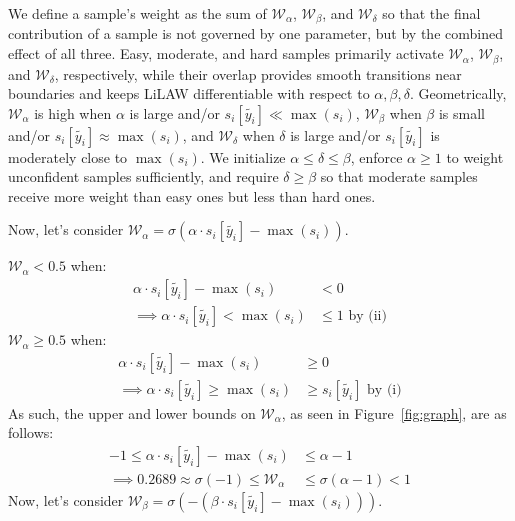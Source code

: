 \documentclass{article}
\theoremstyle{plain}
\theoremstyle{definition}
\theoremstyle{remark}
\begin{document}
We define a sample's weight as the sum of $\mathcal{W}_\alpha$, $\mathcal{W}_\beta$, and $\mathcal{W}_\delta$ so that the final contribution of a sample is not governed by one parameter, but by the combined effect of all three. Easy, moderate, and hard samples primarily activate $\mathcal{W}_\alpha$, $\mathcal{W}_\beta$, and $\mathcal{W}_\delta$, respectively, while their overlap provides smooth transitions near boundaries and keeps LiLAW differentiable with respect to $\alpha,\beta,\delta$. Geometrically, $\mathcal{W}_\alpha$ is high when $\alpha$ is large and/or $s_i[\widetilde{y_i}] \ll \max(s_i)$, $\mathcal{W}_\beta$ when $\beta$ is small and/or $s_i[\widetilde{y_i}] \approx \max(s_i)$, and $\mathcal{W}_\delta$ when $\delta$ is large and/or $s_i[\widetilde{y_i}]$ is moderately close to $\max(s_i)$. We initialize $\alpha \leq \delta \leq \beta$, enforce $\alpha \geq 1$ to weight unconfident samples sufficiently, and require $\delta \geq \beta$ so that moderate samples receive more weight than easy ones but less than hard ones.

Now, let's consider $\mathcal{W}_\alpha = \sigma(\alpha \cdot s_i[\widetilde{y_i}] - \max(s_i))$.

\noindent$\mathcal{W}_\alpha < 0.5$ when:
\begin{align}
    \alpha \cdot s_i[\widetilde{y_i}] - \max(s_i) &< 0 \\
     \implies\alpha \cdot s_i[\widetilde{y_i}] < \max(s_i) &\leq 1 \text{ by (ii)}
\end{align}
$\mathcal{W}_\alpha \geq 0.5$ when:
\begin{align}
    \alpha \cdot s_i[\widetilde{y_i}] - \max(s_i) &\geq 0 \\
    \implies \alpha \cdot s_i[\widetilde{y_i}] \geq \max(s_i) &\geq s_i[\widetilde{y_i}] \text{ by (i)}
\end{align}
As such, the upper and lower bounds on $\mathcal{W}_\alpha$, as seen in Figure~\ref{fig:graph}, are as follows:
\vspace{-0.5em}
\begin{align}
    -1 \leq \alpha \cdot s_i[\widetilde{y_i}] - \max(s_i) &\leq \alpha-1 \\
    \implies 0.2689 \approx \sigma(-1) \leq \mathcal{W}_\alpha &\leq \sigma(\alpha-1) < 1
\end{align}
Now, let's consider $\mathcal{W}_\beta = \sigma(-(\beta \cdot s_i[\widetilde{y_i}] - \max(s_i)))$. 
\end{document}
